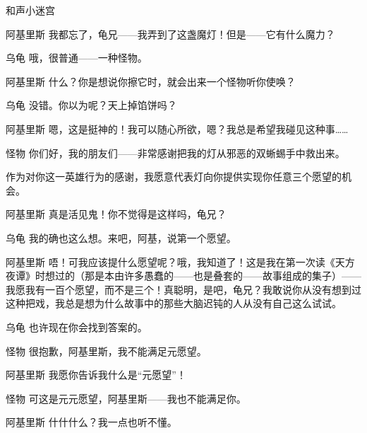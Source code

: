 \begin{dialog}{和声小迷宫}
\begin{dialogue}
\begin{dialogue}
\begin{dialogue}
    \item[阿基里斯]我都忘了，龟兄——我弄到了这盏魔灯！但是——它有什么魔力？

    \item[乌龟]哦，很普通——一种怪物。

    \item[阿基里斯]什么？你是想说你擦它时，就会出来一个怪物听你使唤？

    \item[乌龟]没错。你以为呢？天上掉馅饼吗？

    \item[阿基里斯]嗯，这是挺神的！我可以随心所欲，嗯？我总是希望我碰见这种事……


    \item[怪物]你们好，我的朋友们——非常感谢把我的灯从邪恶的双蜥蜴手中救出来。


    作为对你这一英雄行为的感谢，我愿意代表灯向你提供实现你任意三个愿望的机会。

    \item[阿基里斯]真是活见鬼！你不觉得是这样吗，龟兄？

    \item[乌龟]我的确也这么想。来吧，阿基，说第一个愿望。

    \item[阿基里斯]唔！可我应该提什么愿望呢？哦，我知道了！这是我在第一次读《天方夜谭》时想过的（那是本由许多愚蠢的——也是叠套的——故事组成的集子）——我愿我有一百个愿望，而不是三个！真聪明，是吧，龟兄？我敢说你从没有想到过这种把戏，我总是想为什么故事中的那些大脑迟钝的人从没有自己这么试试。

    \item[乌龟]也许现在你会找到答案的。

    \item[怪物]很抱歉，阿基里斯，我不能满足元愿望。

    \item[阿基里斯]我愿你告诉我什么是“元愿望”！

    \item[怪物]可这是元元愿望，阿基里斯——我也不能满足你。

    \item[阿基里斯]什什什么？我一点也听不懂。


\end{dialogue}
\end{dialogue}
\end{dialogue}
\end{dialog}
